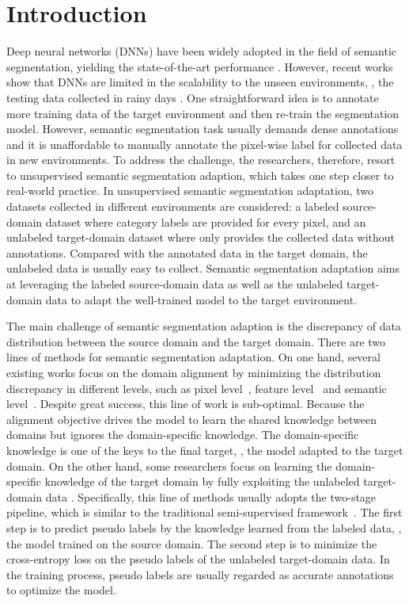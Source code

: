 \section{Introduction}
 Deep neural networks (DNNs)  have been widely adopted in the field of semantic segmentation, yielding the state-of-the-art performance  \cite{liang2017proposal,wei2018revisiting}.
However, recent works show that DNNs are limited in the scalability to the unseen environments, \eg, the testing data collected in rainy days \cite{hendrycks2019benchmarking,wu2019ace}. One straightforward idea is to annotate more training data of the target environment and then re-train the segmentation model. However, semantic segmentation task usually demands dense annotations and it is unaffordable to manually annotate the pixel-wise label for collected data in new environments. 
To address the challenge, the researchers, therefore, resort to unsupervised semantic segmentation adaption, which takes one step closer to real-world practice. In unsupervised semantic segmentation adaptation, two datasets collected in different environments are considered: a labeled source-domain dataset where category labels are provided for every pixel, and an unlabeled target-domain dataset where only provides the collected data without annotations. Compared with the annotated data in the target domain, the unlabeled data is usually easy to collect. Semantic segmentation adaptation aims at leveraging the labeled source-domain data as well as the unlabeled target-domain data to adapt the well-trained model to the target environment.

The main challenge of semantic segmentation adaption is the discrepancy of data distribution between the source domain and the target domain. There are two lines of methods for semantic segmentation adaptation. On one hand, several existing works focus on the domain alignment by minimizing the distribution discrepancy in different levels, such as pixel level~\cite{wu2018dcan,wu2019ace,hoffman2018cycada}, feature level~\cite{huang2018domain,yue2019domain,luo2019significance,zhang2019manifold} and semantic level~\cite{tsai2018learning,tsai2019domain,wang2019class}. Despite great success, this line of work is sub-optimal. Because the alignment objective drives the model to learn the shared knowledge between domains but ignores the domain-specific knowledge. The domain-specific knowledge is one of the keys to the final target, \ie, the model adapted to the target domain. On the other hand, some researchers focus on learning the domain-specific knowledge of the target domain by fully exploiting the unlabeled target-domain data \cite{zou2018unsupervised,zou2019confidence,han2019unsupervised}. Specifically, this line of methods usually adopts the two-stage pipeline, which is similar to the traditional semi-supervised framework~\cite{lee2013pseudo}. The first step is to predict pseudo labels by the knowledge learned from the labeled data, \eg, the model trained on the source domain. The second step is to minimize the cross-entropy loss on the pseudo labels of the unlabeled target-domain data. In the training process, pseudo labels are usually regarded as accurate annotations to optimize the model. 

